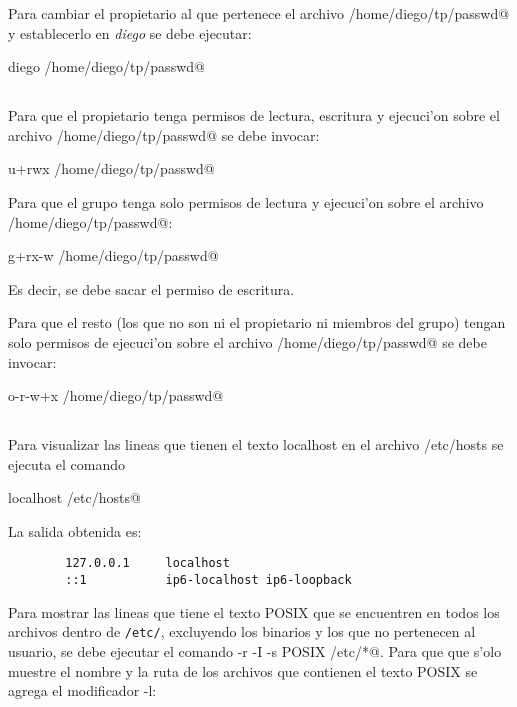 			Para cambiar el propietario al que pertenece el archivo \verb@/home/diego/tp/passwd@ y establecerlo en \emph{diego} se debe ejecutar:

			\verb@chown diego /home/diego/tp/passwd@

		\subsection{}

			Para que el propietario tenga permisos de lectura, escritura y ejecuci'on sobre el archivo \verb@/home/diego/tp/passwd@ se debe invocar:

			\verb@chmod u+rwx /home/diego/tp/passwd@
		
			Para que el grupo tenga solo permisos de lectura y ejecuci'on sobre el archivo \verb@/home/diego/tp/passwd@:

			\verb@chmod g+rx-w /home/diego/tp/passwd@

			Es decir, se debe sacar el permiso de escritura.
		
			Para que el resto (los que no son ni el propietario ni miembros del grupo) tengan solo permisos de ejecuci'on sobre el archivo \verb@/home/diego/tp/passwd@ se debe invocar:

			\verb@chmod o-r-w+x /home/diego/tp/passwd@

		\subsection{}
			Para visualizar las lineas que tienen el texto localhost en el archivo /etc/hosts se ejecuta el comando

			\verb@grep localhost /etc/hosts@

			La salida obtenida es:
      \begin{mylisting}
			\begin{verbatim}
        127.0.0.1     localhost
        ::1           ip6-localhost ip6-loopback
			\end{verbatim}
      \end{mylisting}
			
			Para mostrar las lineas que tiene el texto POSIX que se encuentren en todos los archivos dentro de \verb|/etc/|, excluyendo los binarios y los que no pertenecen al usuario, se debe ejecutar el comando \verb@grep -r -I -s POSIX /etc/*@.
Para que que s'olo muestre el nombre y la ruta de los archivos que contienen el texto POSIX se agrega el modificador -l:

